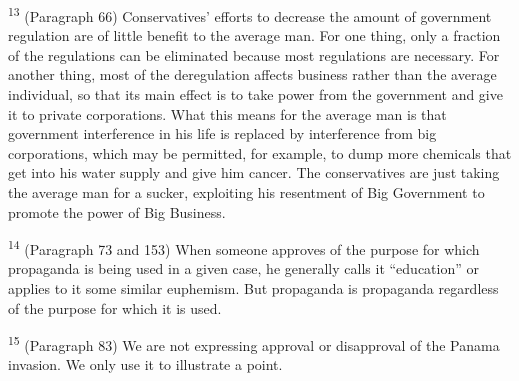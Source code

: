 \documentclass{article}
\begin{document}
\textsuperscript{13} (Paragraph 66) Conservatives’ efforts to decrease the amount of government regulation are of 
little benefit to the average man. For one thing, only a fraction of the regulations can be 
eliminated because most regulations are necessary. For another thing, most of the deregulation 
affects business rather than the average individual, so that its main effect is to take power from 
the government and give it to private corporations. What this means for the average man is that 
government interference in his life is replaced by interference from big corporations, which may 
be permitted, for example, to dump more chemicals that get into his water supply and give him 
cancer. The conservatives are just taking the average man for a sucker, exploiting his resentment 
of Big Government to promote the power of Big Business. \vspace{\baselineskip}

\textsuperscript{14} (Paragraph 73 and 153) When someone approves of the purpose for which propaganda is being 
used in a given case, he generally calls it “education” or applies to it some similar 
euphemism. But propaganda is propaganda regardless of the purpose for which it is used. \vspace{\baselineskip}

\textsuperscript{15} (Paragraph 83) We are not expressing approval or disapproval of the Panama invasion. We only 
use it to illustrate a point. \vspace{\baselineskip}
\end{document}
